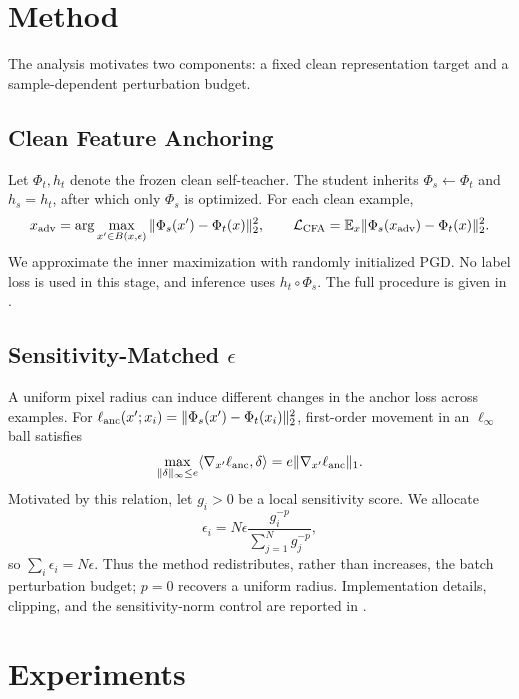 \documentclass{article} %
\theoremstyle{plain}
\begin{document}
\section{Method}
\label{sec:method}
The analysis motivates two components: a fixed clean representation target and
a sample-dependent perturbation budget.

\subsection{Clean Feature Anchoring}
\label{sec:anchor}
Let \(\Phi_t,h_t\) denote the frozen clean self-teacher. The student inherits
\(\Phi_s\leftarrow\Phi_t\) and \(h_s=h_t\), after which only \(\Phi_s\) is
optimized. For each clean example,
\begin{equation}
 x_{\rm adv}=\arg\max_{x'\in B(x,\epsilon)}
 \|\Phi_s(x')-\Phi_t(x)\|_2^2,\qquad
 \mathcal L_{\rm CFA}=\mathbb E_x\|\Phi_s(x_{\rm adv})-\Phi_t(x)\|_2^2.
\label{eqn:anchor}
\end{equation}
We approximate the inner maximization with randomly initialized PGD. No label
loss is used in this stage, and inference uses \(h_t\circ\Phi_s\). The full
procedure is given in .

\subsection{Sensitivity-Matched \(\epsilon\)}
\label{sec:angeps}
A uniform pixel radius can induce different changes in the anchor loss across
examples. For
\(\ell_{\rm anc}(x';x_i)=\|\Phi_s(x')-\Phi_t(x_i)\|_2^2\), first-order
movement in an \(\ell_\infty\) ball satisfies
\begin{equation}
\max_{\|\delta\|_\infty\le e}\langle\nabla_{x'}\ell_{\rm anc},\delta\rangle
=e\|\nabla_{x'}\ell_{\rm anc}\|_1.
\label{eqn:firstorder}
\end{equation}
Motivated by this relation, let \(g_i>0\) be a local sensitivity score. We
allocate
\begin{equation}
\epsilon_i=N\epsilon\frac{g_i^{-p}}{\sum_{j=1}^N g_j^{-p}},
\label{eqn:angeps_ideal}
\end{equation}
so \(\sum_i\epsilon_i=N\epsilon\). Thus the method redistributes, rather than
increases, the batch perturbation budget; \(p=0\) recovers a uniform radius.
Implementation details, clipping, and the sensitivity-norm control are reported
in .

\section{Experiments}
\label{sec:exp}
\end{document}
